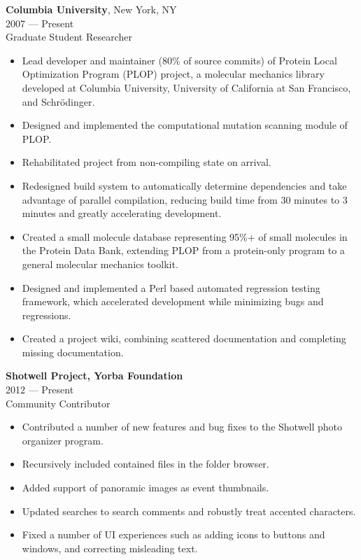 \myfontsize{\bodysize}
\textbf{Columbia University}, New York, NY\\
2007 --- Present\\
Graduate Student Researcher\\
\begin{itemize}[topsep=1ex, partopsep=0ex, parsep=0ex, itemsep=0.5ex]
    \item Lead developer and maintainer ({\mytilde}80\% of source commits) of Protein Local Optimization Program (PLOP) project, a molecular mechanics library developed at Columbia University, University of California at San Francisco, and Schr\"{o}dinger.
    \item Designed and implemented the computational mutation scanning module of PLOP.
    \item Rehabilitated project from non-compiling state on arrival.
    \item Redesigned build system to automatically determine dependencies and take advantage of parallel compilation, reducing build time from {\mytilde}30 minutes to {\mytilde}3 minutes and greatly accelerating development.
    \item Created a small molecule database representing 95\%+ of small molecules in the Protein Data Bank, extending PLOP from a protein-only program to a general molecular mechanics toolkit.
    \item Designed and implemented a Perl based automated regression testing framework, which accelerated development while minimizing bugs and regressions.
    \item Created a project wiki, combining scattered documentation and completing missing documentation.
\end{itemize}
\vspace{\mybigskip}

\textbf{Shotwell Project, Yorba Foundation}\\
2012 --- Present\\
Community Contributor\\
\begin{itemize}[topsep=1ex, partopsep=0ex, parsep=0ex, itemsep=0.5ex]
    \item Contributed a number of new features and bug fixes to the Shotwell photo organizer program.
    \item Recursively included contained files in the folder browser.
    \item Added support of panoramic images as event thumbnails.
    \item Updated searches to search comments and robustly treat accented characters.
    \item Fixed a number of UI experiences such as adding icons to buttons and windows, and correcting misleading text.
\end{itemize}

